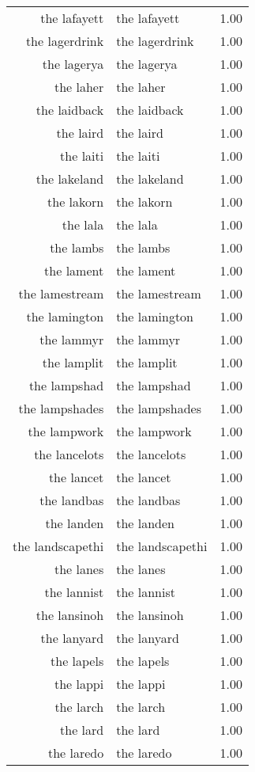 \begin{table}[ht]
\begin{tabular}{rlr}
  the lafayett & the lafayett & 1.00 \\ 
  the lagerdrink & the lagerdrink & 1.00 \\ 
  the lagerya & the lagerya & 1.00 \\ 
  the laher & the laher & 1.00 \\ 
  the laidback & the laidback & 1.00 \\ 
  the laird & the laird & 1.00 \\ 
  the laiti & the laiti & 1.00 \\ 
  the lakeland & the lakeland & 1.00 \\ 
  the lakorn & the lakorn & 1.00 \\ 
  the lala & the lala & 1.00 \\ 
  the lambs & the lambs & 1.00 \\ 
  the lament & the lament & 1.00 \\ 
  the lamestream & the lamestream & 1.00 \\ 
  the lamington & the lamington & 1.00 \\ 
  the lammyr & the lammyr & 1.00 \\ 
  the lamplit & the lamplit & 1.00 \\ 
  the lampshad & the lampshad & 1.00 \\ 
  the lampshades & the lampshades & 1.00 \\ 
  the lampwork & the lampwork & 1.00 \\ 
  the lancelots & the lancelots & 1.00 \\ 
  the lancet & the lancet & 1.00 \\ 
  the landbas & the landbas & 1.00 \\ 
  the landen & the landen & 1.00 \\ 
  the landscapethi & the landscapethi & 1.00 \\ 
  the lanes & the lanes & 1.00 \\ 
  the lannist & the lannist & 1.00 \\ 
  the lansinoh & the lansinoh & 1.00 \\ 
  the lanyard & the lanyard & 1.00 \\ 
  the lapels & the lapels & 1.00 \\ 
  the lappi & the lappi & 1.00 \\ 
  the larch & the larch & 1.00 \\ 
  the lard & the lard & 1.00 \\ 
  the laredo & the laredo & 1.00 \\ 

\end{tabular}
\end{table}
